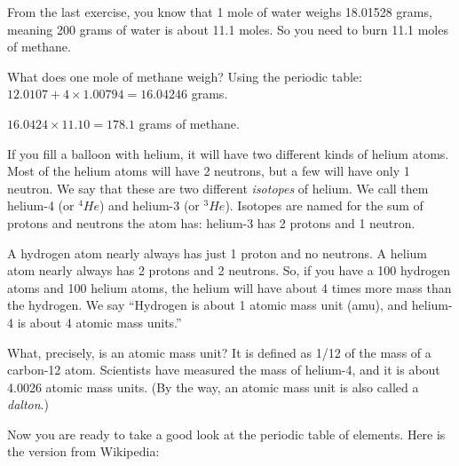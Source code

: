 \begin{Answer}[ref=burning_methane]

From the last exercise, you know that 1 mole of water weighs 18.01528
grams, meaning 200 grams of water is about 11.1 moles. So you need to burn
11.1 moles of methane.

What does one mole of methane weigh? Using the periodic table:
$12.0107 + 4 \times 1.00794 = 16.04246$ grams.

$16.0424 \times 11.10 = 178.1$ grams of methane.

\end{Answer}


If you fill a balloon with helium, it will have two different
kinds of helium atoms. Most of the helium atoms will have 2 neutrons, but a
few will have only 1 neutron. We say that these are two different
\textit{isotopes} of helium. We call them helium-4 (or $^4He$) and
helium-3 (or $^3He$). Isotopes are named for the sum of protons and
neutrons the atom has: helium-3 has 2 protons and 1 neutron.

A hydrogen atom nearly always has just 1 proton and no neutrons. A
helium atom nearly always has 2 protons and 2 neutrons. So, if you
have a 100 hydrogen atoms and 100 helium atoms, the helium will have
about 4 times more mass than the hydrogen. We say ``Hydrogen is about
1 atomic mass unit (amu), and helium-4 is about 4 atomic mass
units.''

What, precisely, is an atomic mass unit? It is defined as 1/12 of
the mass of a carbon-12 atom. Scientists have measured the mass of
helium-4, and it is about 4.0026 atomic mass units. (By the way, an
atomic mass unit is also called a \textit{dalton}.)

\pagebreak


Now you are ready to take a good look at the periodic table of
elements. Here is the version from Wikipedia:

